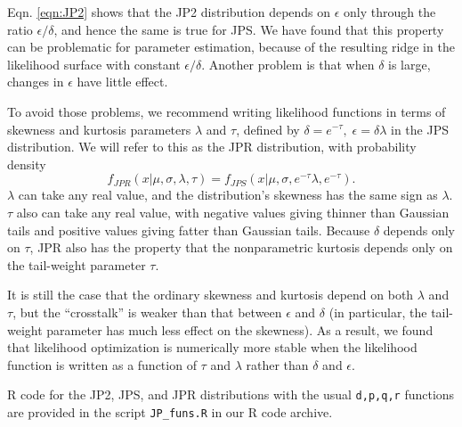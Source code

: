 \documentclass[12pt]{article}
\newcommand{\be}{\begin{equation}}
\newcommand{\ee}{\end{equation}}
\begin{document}
\begin{spacing}{1.35}
	Eqn. \eqref{eqn:JP2} shows that the JP2 distribution depends on $\epsilon$ only through 
	the ratio $\epsilon/\delta$, and hence the same is true for JPS. 
	We have found that this property can be problematic for parameter estimation, 
	because of the resulting ridge in the likelihood surface with constant  
	$\epsilon/\delta$. Another problem is that when $\delta$ is large, changes 
	in $\epsilon$ have little effect. 
	
	To avoid those problems, we recommend writing likelihood functions in terms of 
	skewness and kurtosis parameters $\lambda$ and $\tau$, defined by 
	$\delta = e^{-\tau}, \; \epsilon =  \delta \lambda$ in the 
	JPS distribution. We will refer to this as the JPR distribution, with probability density 
	\be
	f_{JPR}(x \vert \mu, \sigma, \lambda, \tau) = f_{JPS}(x \vert \mu, \sigma, e^{-\tau}\lambda,  e^{-\tau}). 
	\ee
	$\lambda$ can take any real value, and the distribution's skewness has the same sign as $\lambda$. 
	$\tau$ also can take any real value, with negative values giving thinner than Gaussian tails 
	and positive values giving fatter than Gaussian tails. Because $\delta$ depends only on $\tau$, 
	JPR also has the property that the nonparametric kurtosis depends only on the tail-weight parameter $\tau$. 
	
	It is still the case that the ordinary skewness and kurtosis depend on both $\lambda$ and $\tau$, but the
	``crosstalk'' is weaker than that between $\epsilon$ and $\delta$ (in particular, the tail-weight parameter
	has much less effect on the skewness).  
	As a result, we found that likelihood optimization is numerically more stable when the likelihood function is 
	written as a function of $\tau$ and $\lambda$ rather than $\delta$ and $\epsilon$. 
	
	R code for the JP2, JPS, and JPR distributions with the usual \texttt{d,p,q,r} functions are provided 
	in the script \texttt{JP\_funs.R} in our R code archive. 
	

\end{spacing}
\end{document}
